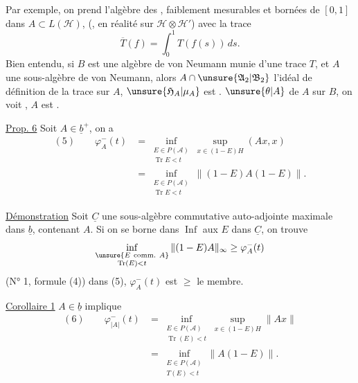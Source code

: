 Par exemple, on prend l'algèbre des ,  faiblement mesurables et bornées de $[0,1]$ dans $A\subset L(\mathcal H)$,  (, en réalité sur $\mathcal H\otimes\mathcal H'$) avec la trace
\[
\overline T(f)=\int_0^1 T(f(s))\,ds.
\]
Bien entendu, si $B$ est une algèbre de von Neumann munie d'une trace $T$, et $A$ une sous-algèbre de von Neumann, alors $A\cap\unsure{\mathfrak A_2|\mathfrak B_2}$    l'idéal de définition de la trace sur $A$, $\unsure{\mathfrak H_A|\mu_A}$ est .  $\unsure{\theta|A}$  de $A$ sur $B$, on voit   ,  $A$ est .


\uline{Prop. 6} Soit $A\in\underline b^+$, on a
\[
\begin{aligned}
(5)\qquad \varphi_A^-(t)
 &=\inf_{\substack{E\in P(\mathcal A)\\ \operatorname{Tr}E<t}}
       \sup_{x\in(1-E)H}(Ax,x)\\
 &=\inf_{\substack{E\in P(\mathcal A)\\ \operatorname{Tr}E<t}}
       \|(1-E)A(1-E)\|.
\end{aligned}
\]

\uline{Démonstration} Soit $\underline C$  une sous-algèbre commutative auto-adjointe maximale dans $\underline b$, contenant $A$. Si on se borne dans  $\operatorname{Inf}$ aux $E$  dans $\underline C$, on trouve
\[
\inf_{\substack{\unsure{E\mathrm{\ comm.\ }A}\\ \operatorname{Tr}(E)<t}}
\|(1-E)A\|_\infty\geq\varphi_A^-(t)
\]
\margin{$\unsure{\Downarrow}$}
(N° 1, formule (4))  dans (5), $\varphi_A^-(t)$ est $\geq$ le  membre.

\uline{Corollaire 1} $A\in\underline b$ implique
\[
\begin{aligned}
(6)\qquad \varphi_{|A|}^-(t)
 &=\inf_{\substack{E\in P(\mathcal A)\\ \operatorname{Tr}(E)<t}}
       \sup_{x\in(1-E)H}\|Ax\|\\
 &=\inf_{\substack{E\in P(\mathcal A)\\ T(E)<t}}\|A(1-E)\|.
\end{aligned}
\]

